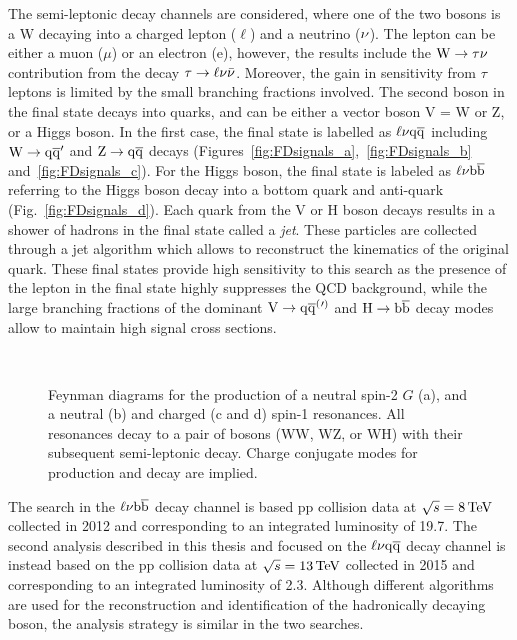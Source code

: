 The semi-leptonic decay channels are considered, where one of the two bosons is a W decaying into a charged lepton ($\ell$) and a neutrino ($\nu$).
The lepton can be either a muon ($\mu$) or an electron (e), however, the results include the $\mathrm{W}\to\tau\nu$ contribution from the decay $\tau\to\ell\nu\bar{\nu}$.
Moreover, the gain in sensitivity from $\tau$ leptons is limited by the small branching fractions involved.
The second boson in the final state decays into quarks, and can be either a vector boson V = W or Z,
or a Higgs boson. In the first case, the final state is labelled as $\ell\nu\mathrm{q}\overline{\mathrm{q}}$ including $\mathrm{W}\to\mathrm{q}\overline{\mathrm{q}}^\prime$ and $\mathrm{Z}\to\mathrm{q}\overline{\mathrm{q}}$ decays (Figures~\ref{fig:FDsignals_a},~\ref{fig:FDsignals_b} and~\ref{fig:FDsignals_c}).
For the Higgs boson, the final state is labeled as $\ell\nu{\mathrm{b}\overline{\mathrm{b}}}$ referring to the Higgs boson decay into a bottom quark and anti-quark (Fig.~\ref{fig:FDsignals_d}).
Each quark from the V or H boson decays results in a shower of hadrons in the final state called a \textit{jet}. These particles are collected through a jet algorithm which allows to reconstruct the kinematics of the original quark.
These final states provide high sensitivity to this search as the presence of the lepton in the final state highly suppresses the QCD background, while the large branching fractions of the dominant $\mathrm{V}\to\mathrm{q}\overline{\mathrm{q}}^({}'^){}$ and $\mathrm{H}\to{\mathrm{b}\overline{\mathrm{b}}}$ decay modes allow to maintain high signal cross sections.

\begin{figure}[!htb]
\centering
{}\hspace{1cm}
\\
\hspace{1cm}
\caption{Feynman diagrams for the production of a neutral spin-2 $G$ (a), and a neutral \Zpr (b) and charged \Wpr (c and d) spin-1 resonances.
All resonances decay to a pair of bosons (WW, WZ, or WH) with their subsequent semi-leptonic decay. Charge conjugate modes for \Wpr production and decay are implied.}
\label{fig:FDsignals}
\end{figure}

The search in the $\ell\nu{\mathrm{b}\overline{\mathrm{b}}}$ decay channel is based pp collision data at $\sqrt{s} = 8\,\text{Te\hspace{-.08em}V}$ collected in 2012 and corresponding to an integrated luminosity of 19.7\fbinv.
The second analysis described in this thesis and focused on the $\ell\nu\mathrm{q}\overline{\mathrm{q}}$ decay channel is instead based on the pp collision data at $\sqrt{s} = 13\,\text{Te\hspace{-.08em}V}$
collected in 2015 and corresponding to an integrated luminosity of 2.3\fbinv.
Although different algorithms are used for the reconstruction and identification of the hadronically decaying boson, the analysis strategy is similar in the two searches.\\

